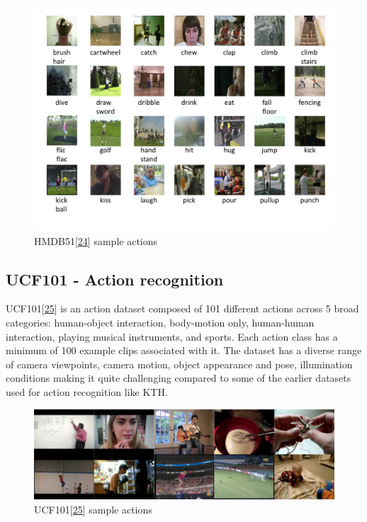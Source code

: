 \documentclass[A4paper,draft]{scrreprt}
\begin{document}
\begin{figure}
\centering
\includegraphics{media/images/hmdb51-sample.png}
\caption{HMDB51{[}\protect\hyperlink{ref-kuehne2011_HMDBlargevideo}{24}{]}
sample actions}\label{fig:dataset:hmdb51:samples}
\end{figure}

\subsection{UCF101 - Action
recognition}\label{ucf101---action-recognition}

UCF101{[}\protect\hyperlink{ref-soomro2012_UCF101Dataset101}{25}{]} is
an action dataset composed of 101 different actions across 5 broad
categories: human-object interaction, body-motion only, human-human
interaction, playing musical instruments, and sports. Each action class
has a minimum of 100 example clips associated with it. The dataset has a
diverse range of camera viewpoints, camera motion, object appearance and
pose, illumination conditions making it quite challenging compared to
some of the earlier datasets used for action recognition like KTH.

\begin{figure}
\centering
\includegraphics{media/images/ucf101-sample.png}
\caption{UCF101{[}\protect\hyperlink{ref-soomro2012_UCF101Dataset101}{25}{]}
sample actions}
\end{figure}
\end{document}
